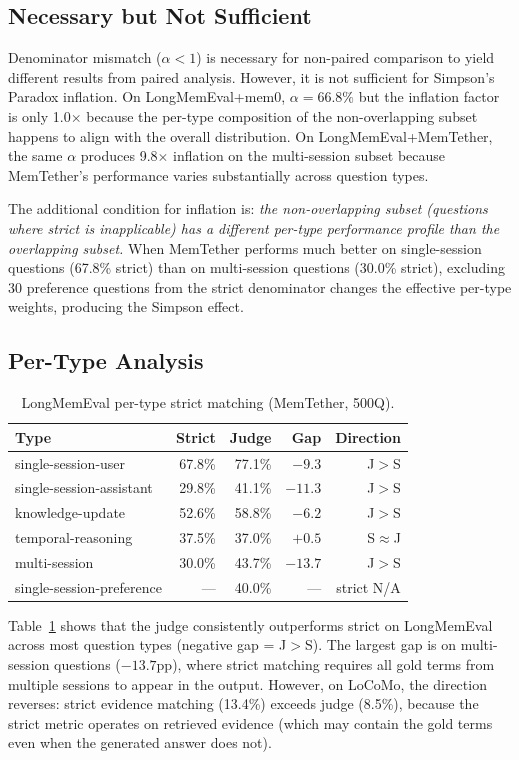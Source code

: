\documentclass{article}
\begin{document}
\subsection{Necessary but Not Sufficient}
Denominator mismatch ($\alpha < 1$) is necessary for non-paired comparison to yield different results from paired analysis. However, it is not sufficient for Simpson's Paradox inflation. On LongMemEval+mem0, $\alpha = 66.8\%$ but the inflation factor is only 1.0$\times$ because the per-type composition of the non-overlapping subset happens to align with the overall distribution. On LongMemEval+MemTether, the same $\alpha$ produces 9.8$\times$ inflation on the multi-session subset because MemTether's performance varies substantially across question types.

The additional condition for inflation is: \emph{the non-overlapping subset (questions where strict is inapplicable) has a different per-type performance profile than the overlapping subset.} When MemTether performs much better on single-session questions (67.8\% strict) than on multi-session questions (30.0\% strict), excluding 30 preference questions from the strict denominator changes the effective per-type weights, producing the Simpson effect.

\subsection{Per-Type Analysis}
\begin{table}[h]
\centering
\caption{LongMemEval per-type strict matching (MemTether, 500Q).}
\label{tab:pertype}
\begin{tabular}{lrrrr}
\toprule
Type & Strict & Judge & Gap & Direction \\
\midrule
single-session-user & 67.8\% & 77.1\% & $-9.3$ & J$>$S \\
single-session-assistant & 29.8\% & 41.1\% & $-11.3$ & J$>$S \\
knowledge-update & 52.6\% & 58.8\% & $-6.2$ & J$>$S \\
temporal-reasoning & 37.5\% & 37.0\% & $+0.5$ & S$\approx$J \\
multi-session & 30.0\% & 43.7\% & $-13.7$ & J$>$S \\
single-session-preference & --- & 40.0\% & --- & strict N/A \\
\bottomrule
\end{tabular}
\end{table}

Table~\ref{tab:pertype} shows that the judge consistently outperforms strict on LongMemEval across most question types (negative gap = J$>$S). The largest gap is on multi-session questions ($-13.7$pp), where strict matching requires all gold terms from multiple sessions to appear in the output. However, on LoCoMo, the direction reverses: strict evidence matching (13.4\%) exceeds judge (8.5\%), because the strict metric operates on retrieved evidence (which may contain the gold terms even when the generated answer does not).
\end{document}
